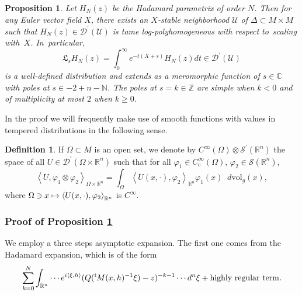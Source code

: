 \documentclass[10pt]{amsart}
\let\pazocal\mathscr
\def\mto{\mathchoice{\longmapsto}{\mapsto}{\mapsto}{\mapsto}}
\newtheorem{proposition}[theorem]{Proposition}
\theoremstyle{definition}
\newtheorem{definition}[theorem]{Definition}
\renewcommand\c{\mathrm{c}}
\let\euler X
\newcommand\dvol{\mathop{}\!d\mathrm{vol}}
\renewcommand{\t}{{{}^{\mathrm{t}\mkern-2mu}}}
\begin{document}
\begin{proposition}\label{prop:feynmanlog}
Let $H_N(z)$ be the Hadamard parametrix of order $N$. Then for any Euler vector field $\euler$, there exists an $\euler$-stable neighborhood $\pazocal{U}$ of $\Delta\subset M\times M$ such that $H_N(z)\in \pazocal{D}^\prime(\pazocal{U})$
is tame log-polyhomogeneous with respect to~scaling with~$\euler$.
In~particular,
\[
\mathfrak{L}_s H_N(z)= \int_0^\infty e^{-t(\euler+s)}H_N(z) dt \in \pazocal{D}^\prime(\pazocal{U})
\]
is a well-defined distribution and extends as a \emph{meromorphic function} of $s\in \mathbb{C}$
with poles at {$s\in -2+n-\mathbb{N}$}. The poles at {$s=k\in \mathbb{Z}$} are simple when $k<0$ and of multiplicity {at most} $2$ when $k\geqslant 0$.
\end{proposition}

In the proof we will frequently make use of smooth functions with values in tempered distributions in the following sense.

\begin{definition}\label{d:smoothfunctionsvaluedindistributions}
If $\Omega \subset M$ is an open set, we denote by $C^\infty(\Omega)\otimes \pazocal{S}^\prime(\mathbb{R}^n)$ the space of all $U\in \pazocal{D}^\prime(\Omega\times \mathbb{R}^n)$ such that
for all $\varphi_1\in C^\infty_\c(\Omega)$, $\varphi_2\in \pazocal{S}(\mathbb{R}^n)$,
\[
\left\langle U,\varphi_1\otimes \varphi_2 \right\rangle_{\Omega\times \mathbb{R}^n}=
\int_\Omega \left\langle U(x,\cdot),\varphi_2\right\rangle_{\mathbb{R}^n} \varphi_1(x)\dvol_g(x),
\]
where $\Omega \ni x\mto \left\langle U(x,\cdot),\varphi_2\right\rangle_{\mathbb{R}^n}$ is $C^\infty$.
\end{definition}

\subsubsection*{Proof of Proposition \ref{prop:feynmanlog}} We employ a three steps asymptotic expansion. The first one comes from the Hadamard expansion, which is of the form
\[
\sum_{k=0}^N \int_{\mathbb{R}^n} \cdots e^{i\left\langle\xi,h\right\rangle} (Q(\t M(x,h)^{-1}\xi)-z)^{-k-1} \cdots d^n\xi +\text{highly regular term}.
\]
\end{document}
